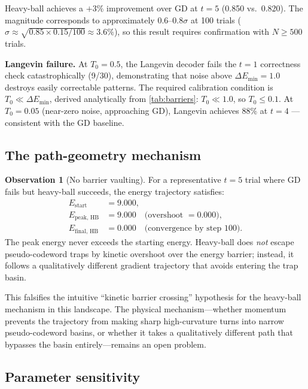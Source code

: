 \documentclass[12pt,a4paper]{article}
\theoremstyle{plain}
\theoremstyle{definition}
\newtheorem{observation}[theorem]{Observation}
\theoremstyle{remark}
\begin{document}
Heavy-ball achieves a $+3\%$ improvement over GD at $t=5$ (0.850 vs.\
0.820).
The magnitude corresponds to approximately $0.6–0.8\sigma$ at 100 trials
($\sigma \approx \sqrt{0.85\times 0.15/100} \approx 3.6\%$), so this
result requires confirmation with $N\geq 500$ trials.

\textbf{Langevin failure.}
At $T_0 = 0.5$, the Langevin decoder fails the $t=1$ correctness check
catastrophically (9/30), demonstrating that noise above
$\Delta E_{\min} = 1.0$ destroys easily correctable patterns.
The required calibration condition is $T_0 \ll \Delta E_{\min}$, derived
analytically from \cref{tab:barriers}: $T_0 \ll 1.0$, so $T_0 \leq 0.1$.
At $T_0 = 0.05$ (near-zero noise, approaching GD), Langevin achieves
$88\%$ at $t=4$ --- consistent with the GD baseline.

\subsection{The path-geometry mechanism}

\begin{observation}[No barrier vaulting]\label{obs:no_vault}
For a representative $t=5$ trial where GD fails but heavy-ball succeeds,
the energy trajectory satisfies:
\begin{align*}
  E_{\mathrm{start}} &= 9.000, \\
  E_{\mathrm{peak,\,HB}} &= 9.000 \quad \text{(overshoot } = 0.000\text{)}, \\
  E_{\mathrm{final,\,HB}} &= 0.000 \quad \text{(convergence by step 100)}.
\end{align*}
The peak energy never exceeds the starting energy.
Heavy-ball does \emph{not} escape pseudo-codeword traps by kinetic
overshoot over the energy barrier; instead, it follows a qualitatively
different gradient trajectory that avoids entering the trap basin.
\end{observation}

This falsifies the intuitive ``kinetic barrier crossing'' hypothesis for
the heavy-ball mechanism in this landscape.
The physical mechanism---whether momentum prevents the trajectory from
making sharp high-curvature turns into narrow pseudo-codeword basins, or
whether it takes a qualitatively different path that bypasses the basin
entirely---remains an open problem.

\subsection{Parameter sensitivity}
\end{document}
